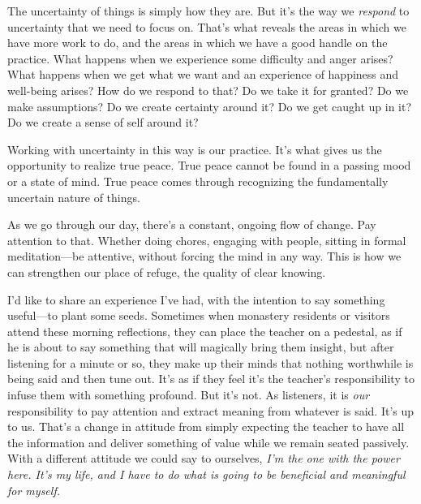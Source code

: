 The uncertainty of things is simply how they are. But it's the way we 
\emph{respond} to uncertainty that we need to focus on. That's what 
reveals the areas in which we have more work to do, and the areas in 
which we have a good handle on the practice. What happens when we 
experience some difficulty and anger arises? What happens when we get 
what we want and an experience of happiness and well-being arises? How 
do we respond to that? Do we take it for granted? Do we make 
assumptions? Do we create certainty around it? Do we get caught up in 
it? Do we create a sense of self around it?

Working with uncertainty in this way is our practice. It's what gives 
us the opportunity to realize true peace. True peace cannot be found in 
a passing mood or a state of mind. True peace comes through recognizing 
the fundamentally uncertain nature of things.

As we go through our day, there's a constant, ongoing flow of change. 
Pay attention to that. Whether doing chores, engaging with people, 
sitting in formal meditation---be attentive, without forcing the mind 
in any way. This is how we can strengthen our place of refuge, the 
quality of clear knowing.


I'd like to share an experience I've had, with the intention to say 
something useful---to plant some seeds. Sometimes when monastery 
residents or visitors attend these morning reflections, they can place 
the teacher on a pedestal, as if he is about to say something that will 
magically bring them insight, but after listening for a minute or so, 
they make up their minds that nothing worthwhile is being said and then 
tune out. It's as if they feel it's the teacher's responsibility to 
infuse them with something profound. But it's not. As listeners, it is 
\emph{our} responsibility to pay attention and extract meaning from 
whatever is said. It's up to us. That's a change in attitude from 
simply expecting the teacher to have all the information and deliver 
something of value while we remain seated passively. With a different 
attitude we could say to ourselves, \emph{I'm the one with the power 
here. It's my life, and I have to do what is going to be beneficial and 
meaningful for myself.}

